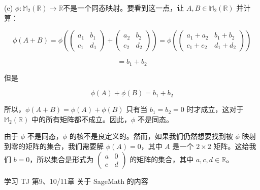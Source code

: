 \documentclass[a4paper, justified]{tufte-handout}
\begin{document}
\begin{solution}
	(e) $\phi: \mathbb{M}_2(\mathbb{R}) \rightarrow \mathbb{R}$不是一个同态映射。要看到这一点，让 $A, B \in \mathbb{M}_2(\mathbb{R})$ 并计算：

	$$ \phi(A + B) = \phi\left(\left(\begin{array}{ll} a_1 & b_1 \\
             c_1      & d_1\end{array}\right) + \left(\begin{array}{ll} a_2 & b_2 \\
             c_2      & d_2\end{array}\right)\right) = \phi\left(\left(\begin{array}{ll} a_1 + a_2 & b_1 + b_2 \\
             c_1 + c_2      & d_1 + d_2\end{array}\right)\right) $$

	$$ = b_1 + b_2 $$

	但是

	$$ \phi(A) + \phi(B) = b_1 + b_2 $$

	所以，$\phi(A + B) = \phi(A) + \phi(B)$ 只有当 $b_1 = b_2 = 0$ 时才成立，这对于 $\mathbb{M}_2(\mathbb{R})$ 中的所有矩阵都不成立。因此，$\phi$ 不是同态。

	由于 $\phi$ 不是同态，$\phi$ 的核不是良定义的。然而，如果我们仍然想要找到被 $\phi$ 映射到零的矩阵的集合，我们需要解 $\phi(A) = 0$，其中 $A$ 是一个 $2 \times 2$ 矩阵。这给我们 $b = 0$，所以集合是形式为 $\left(\begin{array}{ll} a & 0 \\ c & d \end{array}\right)$ 的矩阵的集合，其中 $a, c, d \in \mathbb{R}$。


\end{solution}


\beginoptional


\begin{problem}[SageMath学习]
学习 TJ 第9、10/11章 关于 SageMath 的内容
\end{problem}

\begin{solution}
\end{solution}

\begin{problem}[TJ 11-17]
\end{problem}

\begin{solution}
\end{solution}
\end{document}
